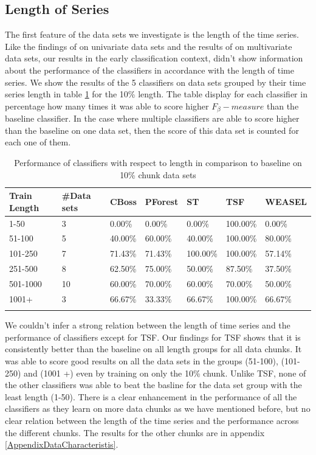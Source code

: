 \subsection{Length of Series}
The first feature of the data sets we investigate is the length of the time series.
Like the findings of \cite{bagnall2017great} on univariate data sets and the results of \cite{fawaz2019deepreview} on multivariate data sets,
our results in the early classification context, didn't show information about the performance of the classifiers in accordance with the length of time series.
We show the results of the 5 classifiers on data sets grouped by their time series length in table \ref{TableLength10} for the 10\% length.
The table display for each classifier in percentage how many times it was able to score higher $F_{\beta}-measure$ than the baseline classifier.
In the case where multiple classifiers are able to score higher than the baseline on one data set, then the score of this data set is counted for each one of them.

\begin{table}[hbt!]
	\setlength\extrarowheight{2pt} %
	\begin{tabularx}{\textwidth}{|X|X|X|X|X|X|X|}
	\hline
	\textbf{Train Length} & \textbf{\#Data sets} & \textbf{CBoss} & \textbf{PForest} & \textbf{ST} & \textbf{TSF} & \textbf{WEASEL} \\ \hline
		1-50 & 3 & 0.00\% & 0.00\% & 0.00\% & 100.00\% & 0.00\% \\ \hline
		51-100 & 5 & 40.00\% & 60.00\% & 40.00\% & 100.00\% & 80.00\% \\ \hline
		101-250 & 7 & 71.43\% & 71.43\% & 100.00\% & 100.00\% & 57.14\% \\ \hline
		251-500 & 8 & 62.50\% & 75.00\% & 50.00\% & 87.50\% & 37.50\% \\ \hline
		501-1000 & 10 & 60.00\% & 70.00\% & 60.00\% & 70.00\% & 50.00\% \\ \hline
		1001+ & 3 & 66.67\% & 33.33\% & 66.67\% & 100.00\% & 66.67\% \\ \hline
	\caption{Performance of classifiers with respect to length in comparison to baseline on 10\% chunk data sets}
	\label{TableLength10}
  \end{tabularx}
\end{table}

We couldn't infer a strong relation between the length of time series and the performance of classifiers except for TSF. 
Our findings for TSF shows that it is consistently better than the baseline on all length groups for all data chunks.
It was able to score good results on all the data sets in the groups (51-100), (101-250) and (1001 +) even by training on only the 10\% chunk.
Unlike TSF, none of the other classifiers was able to beat the basline for the data set group with the least length (1-50).
There is a clear enhancement in the performance of all the classifiers as they learn on more data chunks as we have mentioned before,
but no clear relation between the length of the time series and the performance across the different chunks.
The results for the other chunks are in appendix \ref{AppendixDataCharacteristis}.

